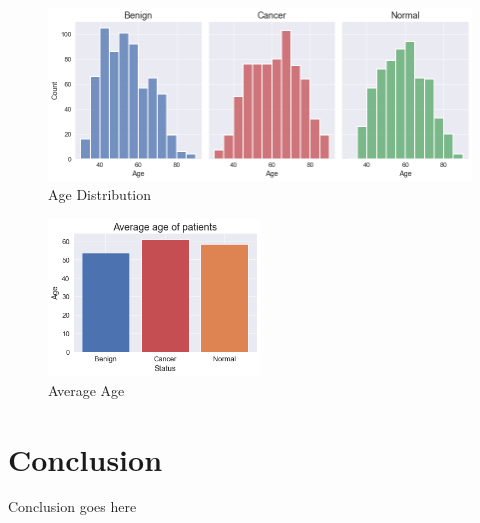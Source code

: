 \documentclass[12pt]{extarticle}
\begin{document}
	
	\begin{figure}[h]
		\centering
		\includegraphics[width=1\textwidth]{pics/Figures/Age_Dist.png}
		\caption{\small{Age Distribution}}
		\label{fig:Age_Dist}
	\end{figure}
	\begin{figure}[h]
		\centering
		\includegraphics[width=0.5\textwidth]{pics/Figures/Avg_Age.png}
		\caption{\small{Average Age}}
		\label{fig:Avg_Age}
	\end{figure}
	
	\newpage	
	\section{Conclusion}
	Conclusion goes here
	\newpage

	
	
	
	
\end{document}
